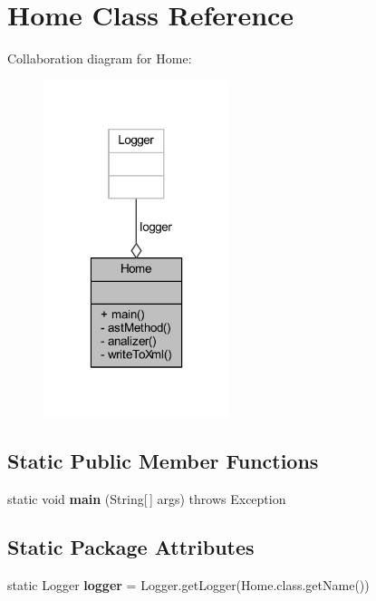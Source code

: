 \hypertarget{class_home}{\section{Home Class Reference}
\label{class_home}
}


Collaboration diagram for Home\-:
\nopagebreak
\begin{figure}[H]
\begin{center}
\leavevmode
\includegraphics[width=154pt]{class_home__coll__graph}
\end{center}
\end{figure}
\subsection*{Static Public Member Functions}
\begin{DoxyCompactItemize}
\item 
\hypertarget{class_home_a824a2d585cb36f1a452ebc5db9b49ed0}{static void {\bfseries main} (String\mbox{[}$\,$\mbox{]} args)  throws Exception}\label{class_home_a824a2d585cb36f1a452ebc5db9b49ed0}

\end{DoxyCompactItemize}
\subsection*{Static Package Attributes}
\begin{DoxyCompactItemize}
\item 
\hypertarget{class_home_ac74d97ae59ddf53153a62e8790619756}{static Logger {\bfseries logger} = Logger.\-get\-Logger(Home.\-class.\-get\-Name())}\label{class_home_ac74d97ae59ddf53153a62e8790619756}

\end{DoxyCompactItemize}

